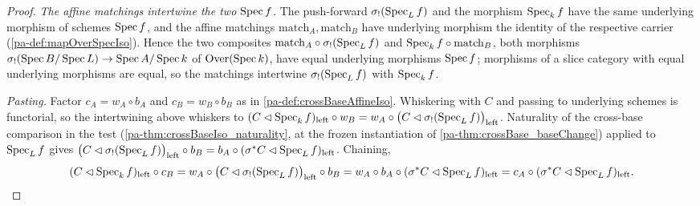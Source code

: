 \begin{proof}
  \leanok
  \emph{The affine matchings intertwine the two \(\operatorname{Spec} f\).} The push-forward
  \(\sigma_{!}(\operatorname{Spec}_L f)\) and the morphism \(\operatorname{Spec}_k f\) have the same underlying
  morphism of schemes \(\operatorname{Spec} f\), and the affine matchings
  \(\mathrm{match}_A, \mathrm{match}_B\) have underlying morphism the identity of the
  respective carrier (\ref{pa-def:mapOverSpecIso}). Hence the two composites
  \(\mathrm{match}_A \circ \sigma_{!}(\operatorname{Spec}_L f)\) and
  \(\operatorname{Spec}_k f \circ \mathrm{match}_B\), both morphisms
  \(\sigma_{!}(\operatorname{Spec} B/\operatorname{Spec} L) \to \operatorname{Spec} A/\operatorname{Spec} k\) of \(\mathrm{Over}(\operatorname{Spec} k)\), have equal
  underlying morphisms \(\operatorname{Spec} f\); morphisms of a slice category with equal underlying
  morphisms are equal, so the matchings intertwine \(\sigma_{!}(\operatorname{Spec}_L f)\) with
  \(\operatorname{Spec}_k f\).

  \emph{Pasting.} Factor \(c_A = w_A \circ b_A\) and \(c_B = w_B \circ b_B\) as in
  \ref{pa-def:crossBaseAffineIso}. Whiskering with \(C\) and passing to underlying schemes
  is functorial, so the intertwining above whiskers to
  \((C \lhd \operatorname{Spec}_k f)_{\mathrm{left}} \circ w_B
    = w_A \circ \bigl(C \lhd \sigma_{!}(\operatorname{Spec}_L f)\bigr)_{\mathrm{left}}\).
  Naturality of the cross-base comparison in the test
  (\ref{pa-thm:crossBaseIso_naturality}, at the frozen instantiation of
  \ref{pa-thm:crossBase_baseChange}) applied to \(\operatorname{Spec}_L f\) gives
  \(\bigl(C \lhd \sigma_{!}(\operatorname{Spec}_L f)\bigr)_{\mathrm{left}} \circ b_B
    = b_A \circ (\sigma^{*}C \lhd \operatorname{Spec}_L f)_{\mathrm{left}}\).
  Chaining,
  \[
    (C \lhd \operatorname{Spec}_k f)_{\mathrm{left}} \circ c_B
      = w_A \circ \bigl(C \lhd \sigma_{!}(\operatorname{Spec}_L f)\bigr)_{\mathrm{left}} \circ b_B
      = w_A \circ b_A \circ (\sigma^{*}C \lhd \operatorname{Spec}_L f)_{\mathrm{left}}
      = c_A \circ (\sigma^{*}C \lhd \operatorname{Spec}_L f)_{\mathrm{left}} . \qedhere
  \]
\end{proof}

